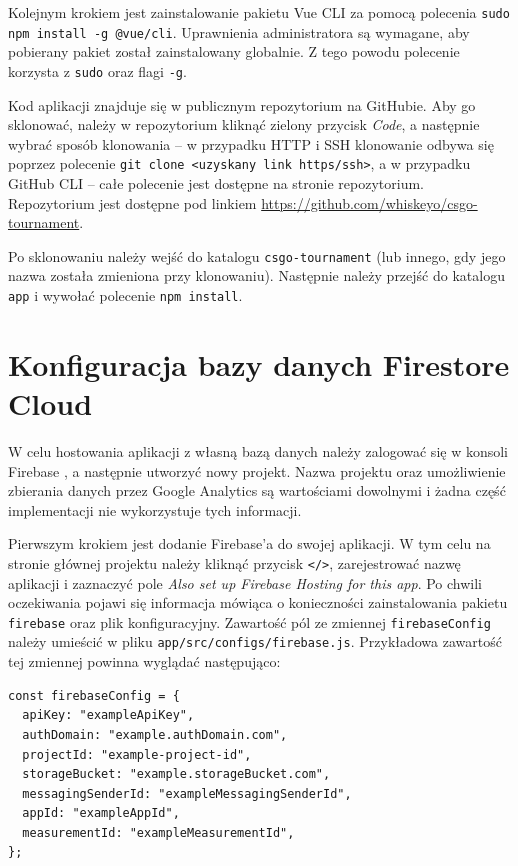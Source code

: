 \documentclass[shortabstract]{iithesis}
\theoremstyle{definition} \newtheorem{definition}{Definicja}[]
\theoremstyle{remark} \newtheorem{remark}[definition]{Observation}
\theoremstyle{plain} \newtheorem{theorem}[definition]{Theorem}
\theoremstyle{plain} \newtheorem{lemma}[definition]{Lemma}
\begin{document}
Kolejnym krokiem jest zainstalowanie pakietu Vue CLI za pomocą polecenia \texttt{sudo npm install -g @vue/cli}. Uprawnienia administratora są wymagane, aby pobierany pakiet został zainstalowany globalnie. Z tego powodu polecenie korzysta z \texttt{sudo} oraz flagi \texttt{-g}.

Kod aplikacji znajduje się w publicznym repozytorium na GitHubie. Aby go sklonować, należy w repozytorium kliknąć zielony przycisk \textit{Code}, a następnie wybrać sposób klonowania -- w przypadku HTTP i SSH klonowanie odbywa się poprzez polecenie \texttt{git clone <uzyskany link https/ssh>}, a w przypadku GitHub CLI -- całe polecenie jest dostępne na stronie repozytorium. Repozytorium jest dostępne pod linkiem \url{https://github.com/whiskeyo/csgo-tournament}.

Po sklonowaniu należy wejść do katalogu \texttt{csgo-tournament} (lub innego, gdy jego nazwa została zmieniona przy klonowaniu). Następnie należy przejść do katalogu \texttt{app} i wywołać polecenie \texttt{npm install}.

\section{Konfiguracja bazy danych Firestore Cloud}
W celu hostowania aplikacji z własną bazą danych należy zalogować się w konsoli Firebase \cite{bib:firebase-console}, a następnie utworzyć nowy projekt. Nazwa projektu oraz umożliwienie zbierania danych przez Google Analytics są wartościami dowolnymi i żadna część implementacji nie wykorzystuje tych informacji.

Pierwszym krokiem jest dodanie Firebase'a do swojej aplikacji. W tym celu na stronie głównej projektu należy kliknąć przycisk \texttt{</>}, zarejestrować nazwę aplikacji i zaznaczyć pole \textit{Also set up Firebase Hosting for this app}. Po chwili oczekiwania pojawi się informacja mówiąca o konieczności zainstalowania pakietu \texttt{firebase} oraz plik konfiguracyjny. Zawartość pól ze zmiennej \texttt{firebaseConfig} należy umieścić w pliku \texttt{app/src/configs/firebase.js}. Przykładowa zawartość tej zmiennej powinna wyglądać następująco:
\begin{verbatim}
const firebaseConfig = {
  apiKey: "exampleApiKey",
  authDomain: "example.authDomain.com",
  projectId: "example-project-id",
  storageBucket: "example.storageBucket.com",
  messagingSenderId: "exampleMessagingSenderId",
  appId: "exampleAppId",
  measurementId: "exampleMeasurementId",
};
\end{verbatim}
\end{document}
